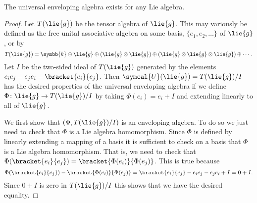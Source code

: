 \documentclass[fleqn]{NotesClass}
\renewcommand{\field}{\symbb{k}}
\newcommand{\universalenveloping}{\symcal{U}}
\begin{document}
    \begin{lma}{}{}
        The universal enveloping algebra exists for any Lie algebra.
        \begin{proof}
            Let \(T(\lie{g})\) be the tensor algebra of \(\lie{g}\).
            This may variously be defined as the free unital associative algebra on some basis, \(\{e_1, e_2, \dotsc\}\) of \(\lie{g}\), or by
            \begin{equation}
                T(\lie{g}) = \field \oplus \lie{g} \oplus (\lie{g} \otimes \lie{g}) \oplus (\lie{g} \otimes \lie{g} \otimes \lie{g}) \oplus \dotsb.
            \end{equation}
            Let \(I\) be the two-sided ideal of \(T(\lie{g})\) generated by the elements \(e_ie_j - e_je_i - \bracket{e_i}{e_j}\).
            Then \(\universalenveloping(\lie{g}) = T(\lie{g})/I\) has the desired properties of the universal enveloping algebra if we define \(\Phi \colon \lie{g} \to T(\lie{g})/I\) by taking \(\Phi(e_i) = e_i + I\) and extending linearly to all of \(\lie{g}\).
            
            We first show that \((\Phi, T(\lie{g})/I)\) is an enveloping algebra.
            To do so we just need to check that \(\Phi\) is a Lie algebra homomorphism.
            Since \(\Phi\) is defined by linearly extending a mapping of a basis it is sufficient to check on a basis that \(\Phi\) is a Lie algebra homomorphism.
            That is, we need to check that \(\Phi(\bracket{e_i}{e_j}) = \bracket{\Phi(e_i)}{\Phi(e_j)}\).
            This is true because
            \begin{equation}
                \Phi(\bracket{e_i}{e_j}) - \bracket{\Phi(e_i)}{\Phi(e_j)} = \bracket{e_i}{e_j} - e_ie_j - e_je_i + I = 0 + I.
            \end{equation}
            Since \(0 + I\) is zero in \(T(\lie{g})/I\) this shows that we have the desired equality.
            

\end{proof}
\end{lma}
\end{document}
